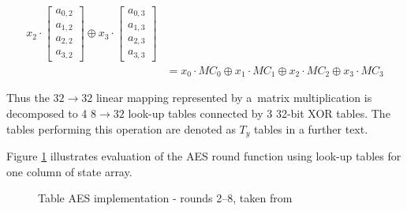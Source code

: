 \documentclass[11pt,oneside,final]{fithesis2}
\begin{document}
\begin{equation}
\begin{aligned}
		    x_2 \cdot \begin{bmatrix} a_{0,2} \\ a_{1,2} \\ a_{2,2} \\ a_{3,2} \end{bmatrix} \oplus
		    x_3 \cdot \begin{bmatrix} a_{0,3} \\ a_{1,3} \\ a_{2,3} \\ a_{3,3} \end{bmatrix} \\
		 &= x_0 \cdot MC_0 \oplus x_1 \cdot MC_1 \oplus x_2 \cdot MC_2 \oplus x_3 \cdot MC_3
    \end{aligned}
    \end{equation}
    
    Thus the $32\rightarrow32$ linear mapping represented by a~matrix multiplication is decomposed to 4 $8\rightarrow32$ look-up tables
    connected by 3 32-bit XOR tables. The tables performing this operation are denoted as $T_y$ tables in a further text.

    Figure \ref{fig:table_aes} illustrates evaluation of the AES round function using look-up tables for one column of state array.

    \begin{figure}[!htb]
    \begin{center}
    \leavevmode
    \centerline{}
    \end{center}
    \caption{Table AES implementation - rounds 2--8, taken from~\citep{Muir_atutorial}}
    \label{fig:table_aes}
    \end{figure}
    
\end{document}
